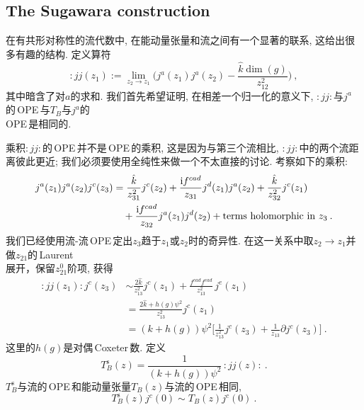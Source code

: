 \subsection*{The Sugawara construction}

在有共形对称性的流代数中, 在能动量张量和流之间有一个显著的联系, 这给出很多有趣的结构. 定义算符
\begin{equation}
    :jj(z_{1}):=\lim_{z_{2}\to z_{1}}\Biggl(j^{a}(z_{1})j^{a}(z_{2})-\frac{\hat{k}\operatorname{dim}(g)}{z_{12}^{2}}\Biggr) \:, \label{11.5.18}
\end{equation}
其中暗含了对$ a $的求和. 我们首先希望证明, 在相差一个归一化的意义下, $:jj: $与$ j^{a} $的\,OPE\,与$ T_{B} $与$ j^{a} $的\\OPE\,是相同的. 

乘积$ :jj: $的\,OPE\,并不是\,OPE\,的乘积, 这是因为与第三个流相比, $:jj: $中的两个流距离彼此更近; 我们必须要使用全纯性来做一个不太直接的讨论. 考察如下的乘积:
\begin{align}
    j^{a}(z_{1})j^{a}(z_{2})j^{c}(z_{3})&=\frac{\hat{k}}{z_{31}^{2}}j^{c}(z_{2})+\frac{\mathrm{i} f^{cad}}{z_{31}}j^{d}(z_{1})j^{a}(z_{2})+\frac{\hat{k}}{z_{32}^{2}}j^{c}(z_{1}) \nonumber \\
    &\quad +\frac{\mathrm{i} f^{cad}}{z_{32}}j^{a}(z_{1})j^{d}(z_{2})+ \text{terms holomorphic in } z_{3} \:. \label{11.5.19}
\end{align}
我们已经使用流-流\,OPE\,定出$ z_{3} $趋于$ z_{1} $或$ z_{2} $时的奇异性. 在这一关系中取$ z_{2}\to z_{1} $并做$ z_{21} $的\,Laurent\,\\展开，保留$ z_{21}^{0} $阶项, 获得
\begin{align}
    :jj(z_{1}):j^{c}(z_{3}) &\sim \frac{2\hat{k}}{z_{13}^{2}}j^{c}(z_{1})+\frac{f^{cad}f^{ead}}{z_{13}^{2}}\,j^{e}(z_{1}) \nonumber\\
    &=\frac{2\hat{k}+h(g)\psi^{2}}{z_{13}^{2}}j^{c}(z_{1}) \nonumber \\
    &=(k+h(g))\psi^{2}\biggl[\frac{1}{z_{13}^{2}}j^{c}(z_{3})+\frac{1}{z_{13}}\partial j^{c}(z_{3})\biggr] \:. \label{11.5.20}
\end{align}
这里的$ h(g) $是对偶\,Coxeter\,数. 定义
\begin{equation}
    T_{B}^{\mathrm{s}}(z) =\frac{1}{(k+h(g))\psi^{2}}\,:jj(z):\:. \label{11.5.21}
\end{equation}
$T_{B}^{\mathrm{s}} $与流的\,OPE\,和能动量张量$ T_{B}(z)$与流的\,OPE\,相同,
\begin{equation}
    T_{B}^{\mathrm{s}}(z)j^{c}(0)\sim
    T_{B}(z)j^{c}(0) \:. \label{11.5.22}
\end{equation}

